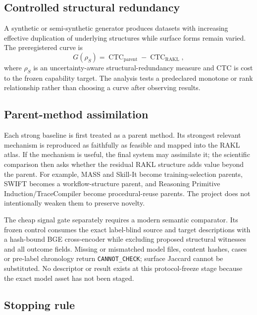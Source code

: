 \subsection{Controlled structural redundancy}

A synthetic or semi-synthetic generator produces datasets with increasing effective duplication of underlying structures while surface forms remain varied. The preregistered curve is
\[
G(\rho_S)=\operatorname{CTC}_{\mathrm{parent}}-\operatorname{CTC}_{\mathrm{RAKL}},
\]
where $\rho_S$ is an uncertainty-aware structural-redundancy measure and CTC is cost to the frozen capability target. The analysis tests a predeclared monotone or rank relationship rather than choosing a curve after observing results.

\subsection{Parent-method assimilation}

Each strong baseline is first treated as a parent method. Its strongest relevant mechanism is reproduced as faithfully as feasible and mapped into the RAKL atlas. If the mechanism is useful, the final system may assimilate it; the scientific comparison then asks whether the residual RAKL structure adds value beyond the parent. For example, MASS and Skill-It become training-selection parents, SWIFT becomes a workflow-structure parent, and Reasoning Primitive Induction/TraceCompiler become procedural-reuse parents. The project does not intentionally weaken them to preserve novelty.

The cheap signal gate separately requires a modern semantic comparator.  Its frozen control consumes the exact label-blind source and target descriptions with a hash-bound BGE cross-encoder while excluding proposed structural witnesses and all outcome fields. Missing or mismatched model files, content hashes, cases or pre-label chronology return \texttt{CANNOT\_CHECK}; surface Jaccard cannot be substituted. No descriptor or result exists at this protocol-freeze stage because the exact model asset has not been staged.

\subsection{Stopping rule}

